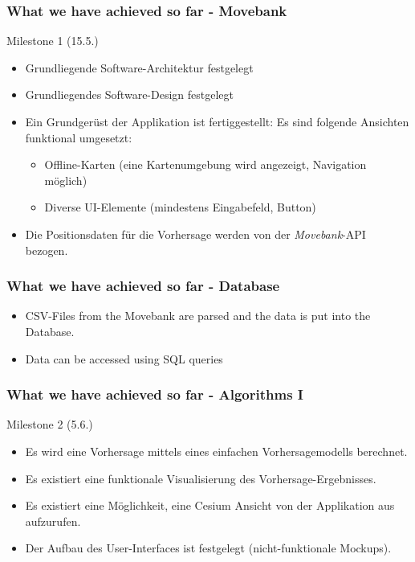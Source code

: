 \documentclass[xcolor=dvipsnames]{beamer}
\begin{document}
\begin{frame}
	\frametitle{What we have achieved so far - Movebank}
	\Large{Milestone 1 (15.5.)}
	\normalsize
	\begin{itemize} 
		\item \color{LightGray}Grundliegende Software-Architektur festgelegt
		\item \color{LightGray}Grundliegendes Software-Design festgelegt
		\item \color{LightGray}Ein Grundgerüst der Applikation ist fertiggestellt: Es sind folgende Ansichten funktional umgesetzt:
		\begin{itemize} 
			\item \color{LightGray}Offline-Karten (eine Kartenumgebung wird angezeigt, Navigation möglich)
			\item \color{LightGray}Diverse UI-Elemente (mindestens Eingabefeld, Button)
		\end{itemize} 
		\item \color{Green}Die Positionsdaten für die Vorhersage werden von der \textit{Movebank}-API bezogen.
	\end{itemize}     
\end{frame}




\begin{frame}
	\frametitle{What we have achieved so far - Database}
    
	\begin{itemize}
		\item CSV-Files from the Movebank are parsed and the data is put into the Database.
		\item Data can be accessed using SQL queries
	\end{itemize}
    
\end{frame}



\begin{frame}
	\frametitle{What we have achieved so far - Algorithms I}
	\large{Milestone 2 (5.6.)}
	\normalsize
	\begin{itemize} 
		\item \color{Green}Es wird eine Vorhersage mittels eines einfachen Vorhersagemodells berechnet.
		\item \color{LightGray}Es existiert eine funktionale Visualisierung des Vorhersage-Ergebnisses.
		\item \color{LightGray}Es existiert eine Möglichkeit, eine Cesium Ansicht von der Applikation aus aufzurufen.
		\item \color{LightGray}Der Aufbau des User-Interfaces ist festgelegt (nicht-funktionale Mockups).
	\end{itemize}
\end{frame}
\end{document}
